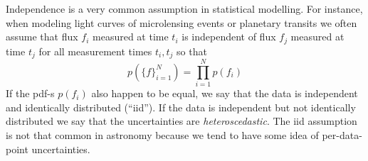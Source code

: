 \documentclass[12pt]{report}
\begin{document}
Independence is a very common assumption in statistical modelling. For instance, when modeling light curves
of microlensing events or planetary transits we often assume that flux $f_i$ measured at time $t_i$ is independent
of flux $f_j$ measured at time $t_j$  for all measurement times $t_i,t_j$ so that
\begin{equation}
    p(\{f\}_{i=1}^N)=\prod_{i=1}^Np(f_i)
    \label{eq:likelihood_indep}
\end{equation}
If the pdf-s $p(f_i)$ also happen to be equal, we say that the data is independent and
identically distributed (``iid''). If the data is independent but not identically distributed
we say that the uncertainties are \emph{heteroscedastic}.
The iid assumption is not that common in astronomy because we tend to have some idea of per-data-point
uncertainties.
\end{document}
